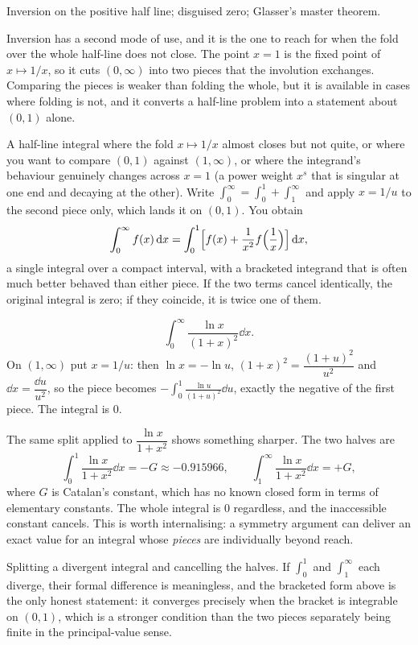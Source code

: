 \begin{seealsob}Inversion on the positive half line; disguised zero; Glasser's master theorem.\end{seealsob}

Inversion has a second mode of use, and it is the one to reach for when the fold over the whole half-line does not close. The point $x=1$ is the fixed point of $x\mapsto1/x$, so it cuts $(0,\infty)$ into two pieces that the involution exchanges. Comparing the pieces is weaker than folding the whole, but it is available in cases where folding is not, and it converts a half-line problem into a statement about $(0,1)$ alone.

\cue A half-line integral where the fold $x\mapsto1/x$ almost closes but not quite, or where you want to compare $(0,1)$ against $(1,\infty)$, or where the integrand's behaviour genuinely changes across $x=1$ (a power weight $x^{s}$ that is singular at one end and decaying at the other).
\method Write $\int_0^{\infty}=\int_0^1+\int_1^{\infty}$ and apply $x=1/u$ to the second piece only, which lands it on $(0,1)$. You obtain
\[\int_0^{\infty}f(x)\,\mathrm{d} x=\int_0^1\Bigl[f(x)+\frac{1}{x^{2}}f\Bigl(\frac1x\Bigr)\Bigr]\,\mathrm{d} x,\]
a single integral over a compact interval, with a bracketed integrand that is often much better behaved than either piece. If the two terms cancel identically, the original integral is zero; if they coincide, it is twice one of them.

\begin{worked}
\[\int_0^{\infty}\frac{\ln x}{(1+x)^{2}}\dd x.\]
On $(1,\infty)$ put $x=1/u$: then $\ln x=-\ln u$, $(1+x)^{2}=\dfrac{(1+u)^{2}}{u^{2}}$ and $\dd x=\dfrac{\dd u}{u^{2}}$, so the piece becomes $-\displaystyle\int_0^1\frac{\ln u}{(1+u)^{2}}\dd u$, exactly the negative of the first piece. The integral is $0$.

The same split applied to $\dfrac{\ln x}{1+x^{2}}$ shows something sharper. The two halves are
\[\int_0^1\frac{\ln x}{1+x^{2}}\dd x=-G\approx-0.915966,\qquad \int_1^{\infty}\frac{\ln x}{1+x^{2}}\dd x=+G,\]
where $G$ is Catalan's constant, which has no known closed form in terms of elementary constants. The whole integral is $0$ regardless, and the inaccessible constant cancels. This is worth internalising: a symmetry argument can deliver an exact value for an integral whose \emph{pieces} are individually beyond reach.
\end{worked}

\begin{trap}
Splitting a divergent integral and cancelling the halves. If $\int_0^1$ and $\int_1^{\infty}$ each diverge, their formal difference is meaningless, and the bracketed form above is the only honest statement: it converges precisely when the bracket is integrable on $(0,1)$, which is a stronger condition than the two pieces separately being finite in the principal-value sense.
\end{trap}

